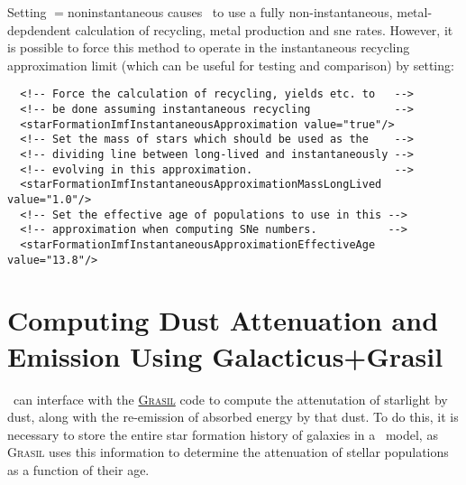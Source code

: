 Setting {\normalfont \ttfamily [stellarPopulationPropertiesMethod]}$=${\normalfont \ttfamily noninstantaneous} causes \glc\ to use a fully non-instantaneous, metal-depdendent calculation of recycling, metal production and \gls{sne} rates. However, it is possible to force this method to operate in the instantaneous recycling approximation limit (which can be useful for testing and comparison) by setting:
\begin{verbatim}
  <!-- Force the calculation of recycling, yields etc. to   -->
  <!-- be done assuming instantaneous recycling             -->
  <starFormationImfInstantaneousApproximation value="true"/>
  <!-- Set the mass of stars which should be used as the    -->
  <!-- dividing line between long-lived and instantaneously -->
  <!-- evolving in this approximation.                      -->
  <starFormationImfInstantaneousApproximationMassLongLived value="1.0"/>
  <!-- Set the effective age of populations to use in this -->
  <!-- approximation when computing SNe numbers.           -->
  <starFormationImfInstantaneousApproximationEffectiveAge value="13.8"/>
\end{verbatim}

\section{Computing Dust Attenuation and Emission Using Galacticus+Grasil}\label{sec:TutorialGrasil}

\glc\ can interface with the \href{http://adlibitum.oat.ts.astro.it/silva/grasil/grasil.html}{\normalfont \scshape Grasil} code to compute the attenutation of starlight by dust, along with the re-emission of absorbed energy by that dust. To do this, it is necessary to store the entire star formation history of galaxies in a \glc\ model, as {\normalfont \scshape Grasil} uses this information to determine the attenuation of stellar populations as a function of their age.

